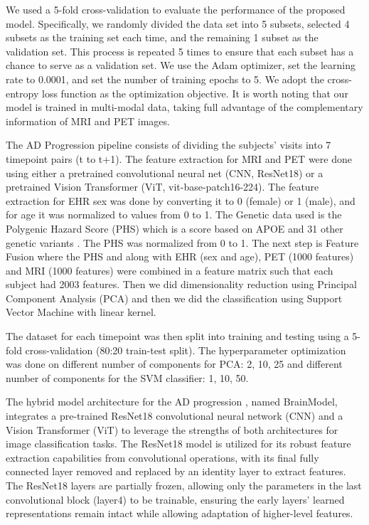 We used a 5-fold cross-validation to evaluate the performance of the proposed model. Specifically, we randomly divided the data set into 5 subsets, selected 4 subsets as the training set each time, and the remaining 1 subset as the validation set. This process is repeated 5 times to ensure that each subset has a chance to serve as a validation set. We use the Adam optimizer, set the learning rate to 0.0001, and set the number of training epochs to 5. We adopt the cross-entropy loss function as the optimization objective. It is worth noting that our model is trained in multi-modal data, taking full advantage of the complementary information of MRI and PET images. 

The AD Progression pipeline consists of dividing the subjects’ visits into 7 timepoint pairs (t to t+1). The feature extraction for MRI and PET were done using either a pretrained convolutional neural net (CNN, ResNet18) or a pretrained Vision Transformer (ViT, vit-base-patch16-224). The feature extraction for EHR sex was done by converting it to 0 (female) or 1 (male), and for age it was normalized to values from 0 to 1. The Genetic data used is the Polygenic Hazard Score (PHS) which is a score based on APOE and 31 other genetic variants \cite{desikan_genetic_2017}. The PHS was normalized from 0 to 1. The next step is Feature Fusion where the PHS and along with EHR (sex and age), PET (1000 features) and MRI (1000 features) were combined in a feature matrix such that each subject had 2003 features. Then we did dimensionality reduction using Principal Component Analysis (PCA) and then we did the classification using Support Vector Machine with linear kernel.  

The dataset for each timepoint was then split into training and testing using a 5-fold cross-validation (80:20 train-test split). The hyperparameter optimization was done on different number of components for PCA: 2, 10, 25 and different number of components for the SVM classifier: 1, 10, 50. 

The hybrid model architecture for the AD progression , named BrainModel, integrates a pre-trained ResNet18 convolutional neural network (CNN) and a Vision Transformer (ViT) to leverage the strengths of both architectures for image classification tasks. The ResNet18 model is utilized for its robust feature extraction capabilities from convolutional operations, with its final fully connected layer removed and replaced by an identity layer to extract features. The ResNet18 layers are partially frozen, allowing only the parameters in the last convolutional block (layer4) to be trainable, ensuring the early layers' learned representations remain intact while allowing adaptation of higher-level features.

